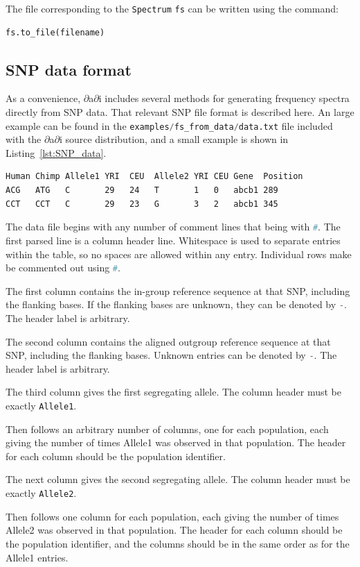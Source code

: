 \documentclass[12pt]{article}
\makeatletter
\newcommand{\dadi}{$\partial$a$\partial$i\xspace}
\newcommand{\py}[1]{\lstinline[language=Python, showstringspaces=False]@#1@}
\makeatother
\begin{document}
The file corresponding to the \py{Spectrum} \py{fs} can be written using the command:
\begin{lstlisting}
fs.to_file(filename)
\end{lstlisting}

\subsection{SNP data format}

As a convenience, \dadi includes several methods for generating frequency spectra directly from SNP data.
That relevant SNP file format is described here.
An large example can be found in the \py{examples/fs_from_data/data.txt} file included with the \dadi source distribution, and a small example is shown in Listing~\ref{lst:SNP_data}.

\begin{lstlisting}[caption={Example of SNP file format}, float, label={lst:SNP_data}]
Human Chimp Allele1 YRI  CEU  Allele2 YRI CEU Gene  Position
ACG   ATG   C       29   24   T       1   0   abcb1 289
CCT   CCT   C       29   23   G       3   2   abcb1 345
\end{lstlisting}

The data file begins with any number of comment lines that being with \py{#}.
The first parsed line is a column header line.
Whitespace is used to separate entries within the table, so no spaces are allowed within any entry.
Individual rows make be commented out using \py{#}.

The first column contains the in-group reference sequence at that SNP, including the flanking bases.
If the flanking bases are unknown, they can be denoted by \py{-}.
The header label is arbitrary.

The second column contains the aligned outgroup reference sequence at that SNP, including the flanking bases.
Unknown entries can be denoted by \py{-}.
The header label is arbitrary.

The third column gives the first segregating allele.
The column header must be exactly \py{Allele1}.

Then follows an arbitrary number of columns, one for each population, each giving the number of times Allele1 was observed in that population.
The header for each column should be the population identifier.

The next column gives the second segregating allele.
The column header must be exactly \py{Allele2}.

Then follows one column for each population, each giving the number of times Allele2 was observed in that population.
The header for each column should be the population identifier, and the columns should be in the same order as for the Allele1 entries.
\end{document}

